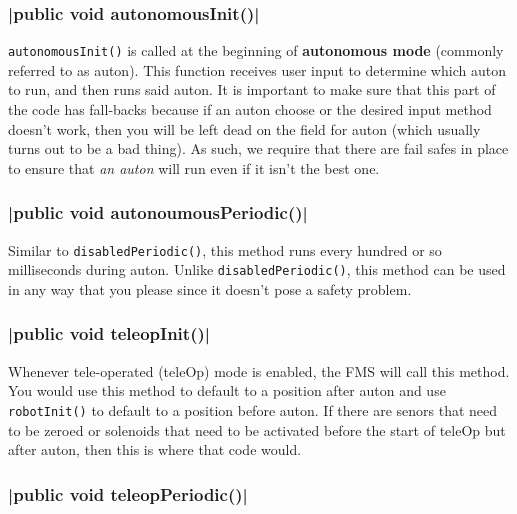 \documentclass[11pt,fleqn]{article}
\begin{document}
\subsubsection{|public void autonomousInit()|}
\texttt{autonomousInit()} is called at the beginning of \textbf{autonomous mode} (commonly referred to
as auton). This function receives user input to determine which auton to run, and then runs said auton.
It is important to make sure that this part of the code has fall-backs because if an auton choose or the
desired input method doesn't work, then you will be left dead on the field for auton (which usually turns
out to be a bad thing). As such, we require that there are fail safes in place to ensure that \textit
{an auton} will run even if it isn't the best one.

\subsubsection{|public void autonoumousPeriodic()|}
Similar to \texttt{disabledPeriodic()}, this method runs every hundred or so milliseconds during auton.
Unlike \texttt{disabledPeriodic()}, this method can be used in any way that you please since it doesn't
pose a safety problem.

\subsubsection{|public void teleopInit()|}
Whenever tele-operated (teleOp) mode is enabled, the FMS will call this method. You would use this method
to default to a position after auton and use \texttt{robotInit()} to default to a position before auton.
If there are senors that need to be zeroed or solenoids that need to be activated before the start of
teleOp but after auton, then this is where that code would. 

\subsubsection{|public void teleopPeriodic()|}
\end{document}
